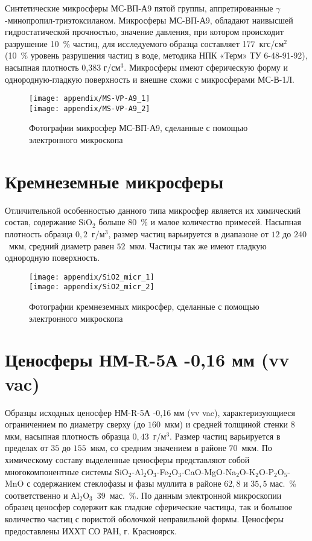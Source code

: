 Синтетические микросферы МС-ВП-А9 пятой группы, аппретированные $\gamma$-минопропил-триэтоксиланом. Микросферы МС-ВП-А9, обладают наивысшей гидростатической прочностью, значение давления, при котором происходит разрушение 10~\% частиц, для исследуемого образца составляет 177~кгс/см$^2$ (10~\% уровень разрушения частиц в воде, методика НПК «Терм» ТУ 6-48-91-92), насыпная плотность 0,383 г/см$^3$. Микросферы имеют сферическую форму и однородную-гладкую поверхность и внешне схожи с микросферами МС-В-1Л.

\begin{figure}[h!]
	\centering
	\texttt{[image: appendix/MS-VP-A9\_1]} \\
	\medskip
	\texttt{[image: appendix/MS-VP-A9\_2]}
	\caption{Фотографии микросфер МС-ВП-А9, сделанные с помощью электронного микроскопа}
	\label{pic:MS-VP-A9}  
\end{figure}


\newpage
\section{Кремнеземные микросферы}

Отличительной особенностью данного типа микросфер является их химический состав, содержание SiO$_2$ больше $80$~\% и малое количество примесей. Насыпная плотность образца $0,2$~г/м$^3$, размер частиц варьируется в диапазоне от $12$ до $240$~мкм, средний диаметр равен $52$~мкм. Частицы так же имеют гладкую однородную поверхность. 

\begin{figure}[h!]
	\centering
	\texttt{[image: appendix/SiO2\_micr\_1]} \\
	\medskip
	\texttt{[image: appendix/SiO2\_micr\_2]}
	\caption{Фотографии кремнеземных микросфер, сделанные с помощью электронного микроскопа}
	\label{pic:SiO2_micr}  
\end{figure}


\newpage
\section{Ценосферы  НМ-R-5А -0,16 мм (vv vac)}

Образцы исходных ценосфер НМ-R-5А -0,16 мм (vv vac), характеризующиеся ограничением по диаметру сверху (до $160$~мкм) и средней толщиной стенки 8 мкм, насыпная плотность образца $0,43$~г/м$^3$. Размер частиц варьируется в пределах от $35$ до $155$~мкм, со средним значением в районе $70$~мкм. По химическому составу выделенные ценосферы представляют собой многокомпонентные системы SiO$_2$-Al$_2$O$_3$-Fe$_2$O$_3$-CaO-MgO-Na$_2$O-K$_2$O-P$_2$O$_5$-MnO с содержанием стеклофазы и фазы муллита в районе $62,8$ и $35,5$ мас.~\% соответственно и Al$_2$O$_3$~$39$~мас.~\%. 
По данным электронной микроскопии образец ценосфер содержит как гладкие сферические частицы, так и большое количество частиц с пористой оболочкой неправильной формы. Ценосферы предоставлены ИХХТ СО РАН, г. Красноярск.

